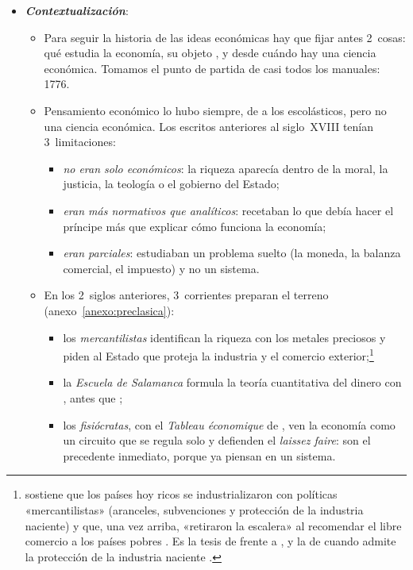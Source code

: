 \documentclass[11pt]{article}
\begin{document}
\begin{itemize}
\item \textbf{\emph{Contextualización}}:
  \begin{itemize}
  \item Para seguir la historia de las ideas económicas hay que fijar antes 2~cosas: qué estudia la economía, su objeto , y desde cuándo hay una ciencia económica. Tomamos el punto de partida de casi todos los manuales: 1776.
  \item Pensamiento económico lo hubo siempre, de  a los escolásticos, pero no una ciencia económica. Los escritos anteriores al siglo~XVIII tenían 3~limitaciones:
    \begin{itemize}
    \item \emph{no eran solo económicos}: la riqueza aparecía dentro de la moral, la justicia, la teología o el gobierno del Estado;
    \item \emph{eran más normativos que analíticos}: recetaban lo que debía hacer el príncipe más que explicar cómo funciona la economía;
    \item \emph{eran parciales}: estudiaban un problema suelto (la moneda, la balanza comercial, el impuesto) y no un sistema.
    \end{itemize}
  \item En los 2~siglos anteriores, 3~corrientes preparan el terreno (anexo~\ref{anexo:preclasica}):
    \begin{itemize}
    \item los \emph{mercantilistas} identifican la riqueza con los metales preciosos y piden al Estado que proteja la industria y el comercio exterior;\footnote{\textcite{Chang2002} sostiene que los países hoy ricos se industrializaron con políticas «mercantilistas» (aranceles, subvenciones y protección de la industria naciente) y que, una vez arriba, «retiraron la escalera» al recomendar el libre comercio a los países pobres . Es la tesis de \textcite{List1841System} frente a , y la de  cuando admite la protección de la industria naciente .}
    \item la \emph{Escuela de Salamanca} formula la teoría cuantitativa del dinero con \textcite{Azpilcueta1556Cambios}, antes que \textcite{Bodin1568Reponse};
    \item los \emph{fisiócratas}, con el \emph{Tableau économique} de \textcite{Quesnay1758Tableau}, ven la economía como un circuito que se regula solo y defienden el \emph{laissez faire}: son el precedente inmediato, porque ya piensan en un sistema.

\end{itemize}
\end{itemize}
\end{itemize}
\end{document}
